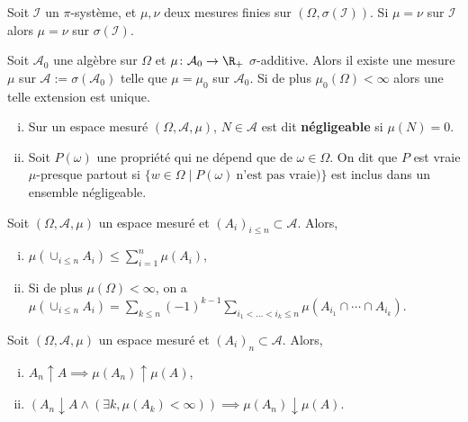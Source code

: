 	\begin{pop}
		Soit $\mathcal{I}$ un $\pi$-système, et $\mu, \nu$ deux mesures finies sur $(\Omega,\sigma(\mathcal{I}))$.
		Si $\mu = \nu$ sur $\mathcal{I}$ alors $\mu = \nu$ sur $\sigma(\mathcal{I})$.
	\end{pop}

	\begin{thm}
		Soit $\mathcal{A}_0$ une algèbre sur $\Omega$ et $\mu \colon \mathcal{A}_0 \to \R_+$ $\sigma$-additive.
		Alors il existe une mesure $\mu$ sur $\mathcal{A} := \sigma(\mathcal{A_0})$ telle que $\mu = \mu_0$ sur $\mathcal{A}_0$.
		Si de plus $\mu_0(\Omega) < \infty$ alors une telle extension est unique.
	\end{thm}

	\begin{defn}
		\begin{enumerate}[(i)]
			\item Sur un espace mesuré $(\Omega,\mathcal{A},\mu)$, $N \in \mathcal{A}$ est dit \textbf{négligeable} si $\mu(N) = 0$.
			\item Soit $P(\omega)$ une propriété qui ne dépend que de $\omega \in \Omega$.
				On dit que $P$ est vraie $\mu$-presque partout si $\{ w \in \Omega \mid P(\omega)\ \text{n'est pas vraie}) \}$ est inclus dans un ensemble négligeable.
		\end{enumerate}
	\end{defn}
	
	\begin{pop}
		Soit $(\Omega,\mathcal{A},\mu)$ un espace mesuré et $(A_i)_{i \leq n} \subset \mathcal{A}$.
		Alors,
		\begin{enumerate}[(i)]
			\item $\mu(\cup_{i \leq n} A_i) \leq \sum_{i = 1}^n \mu(A_i)$,
			\item Si de plus $\mu(\Omega) < \infty$, on a $\mu(\cup_{i \leq n} A_i) = \sum_{k \leq n} (-1)^{k - 1} \sum_{i_1 < \ldots < i_k \leq n} \mu(A_{i_1} \cap \cdots \cap A_{i_k})$.
		\end{enumerate}
	\end{pop}

	\begin{pop}
		Soit $(\Omega,\mathcal{A},\mu)$ un espace mesuré et $(A_i)_n \subset \mathcal{A}$.
		Alors,
		\begin{enumerate}[(i)]
			\item $A_n \uparrow A \implies \mu(A_n) \uparrow \mu(A)$,
			\item $\left( A_n \downarrow A \wedge (\exists k, \mu(A_k) < \infty) \right) \implies \mu(A_n) \downarrow  \mu(A)$.
		\end{enumerate}
	\end{pop}

